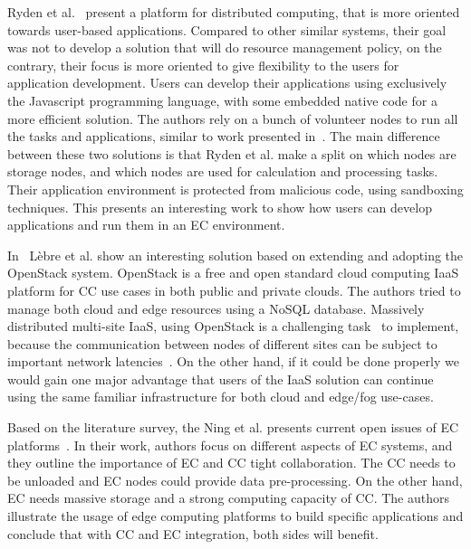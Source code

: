 Ryden et al.~\cite{RydenOCW14} present a platform for distributed computing, that is more oriented towards user-based applications\label{sec:rayden}. Compared to other similar systems, their goal was not to develop a solution that will do resource management policy, on the contrary, their focus is more oriented to give flexibility to the users for application development. Users can develop their applications using exclusively the Javascript programming language, with some embedded native code for a more efficient solution. The authors rely on a bunch of volunteer nodes to run all the tasks and applications, similar to work presented in~\cite{CiobanuNPDMM19}. The main difference between these two solutions is that Ryden et al. make a split on which nodes are storage nodes, and which nodes are used for calculation and processing tasks. Their application environment is protected from malicious code, using sandboxing techniques. This presents an interesting work to show how users can develop applications and run them in an EC environment.

In~\cite{LebrePSD17} L{\`{e}}bre et al. show an interesting solution based on extending and adopting the OpenStack system. OpenStack is a free and open standard cloud computing IaaS platform for CC use cases in both public and private clouds. The authors tried to manage both cloud and edge resources using a NoSQL database. Massively distributed multi-site IaaS, using OpenStack is a challenging task~\cite{LebrePSD17} to implement, because the communication between nodes of different sites can be subject to important network latencies~\cite{LebrePSD17}. On the other hand, if it could be done properly we would gain one major advantage that users of the IaaS solution can continue using the same familiar infrastructure for both cloud and edge/fog use-cases.

Based on the literature survey, the Ning et al. presents current open issues of EC platforms~\cite{NingLSY20}. In their work, authors focus on different aspects of EC systems, and they outline the importance of EC and CC tight collaboration. The CC needs to be unloaded and EC nodes could provide data pre-processing. On the other hand, EC needs massive storage and a strong computing capacity of CC. The authors illustrate the usage of edge computing platforms to build specific applications and conclude that with CC and EC integration, both sides will benefit.

